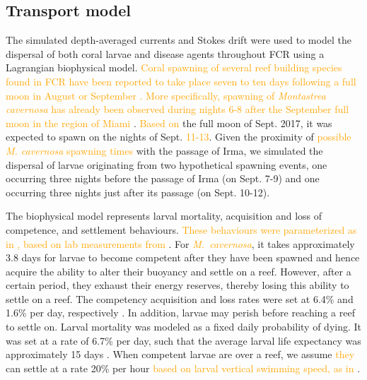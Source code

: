 \documentclass[fleqn,10pt]{wlscirep}
\newcommand{\modif}[1]{\textcolor{orange}{#1}}
\begin{document}
\subsection{Transport model}
The simulated depth-averaged currents and Stokes drift were used to model the dispersal of both coral larvae and disease agents throughout FCR using a Lagrangian biophysical model. \modif{Coral spawning of several reef building species found in FCR have been reported to take place seven to ten days following a full moon in August or September \citep{hagman1998timing}. More specifically, spawning of \textit{Montastrea cavernosa} has already been observed during nights 6-8 after the September full moon in the region of Miami \citep{bright2021quicklook}}. \modif{Based on} the full moon of Sept. 2017, it was expected to spawn on the nights of Sept. \modif{11-13}. Given the proximity of \modif{possible \textit{M. cavernosa} spawning times} with the passage of Irma, we simulated the dispersal of larvae originating from two hypothetical spawning events, one occurring three nights before the passage of Irma (on Sept. 7-9) and one occurring three nights just after its passage (on Sept. 10-12).

The biophysical model represents larval mortality, acquisition and loss of competence, and settlement behaviours. \modif{These behaviours were parameterized as in \cite{Frys2020}, based on lab measurements from \cite{Kuba2016}}. For \modif{\it M.~cavernosa}, it takes approximately 3.8 days for larvae to become competent after they have been spawned and hence acquire the ability to alter their buoyancy and settle on a reef. However, after a certain period, they exhaust their energy reserves, thereby losing this ability to settle on a reef. The competency acquisition and loss rates were set at 6.4\% and 1.6\% per day, respectively \citep{Kuba2016}. In addition, larvae may perish before reaching a reef to settle on. Larval mortality was modeled as a fixed daily probability of dying. It was set at a rate of 6.7\% per day, such that the average larval life expectancy was approximately 15 days \citep{Kuba2016}. When competent larvae are over a reef, we assume \modif{they} can settle at a rate 20\% per hour \modif{based on larval vertical swimming speed, as in \cite{king2023larval}}.
\end{document}
